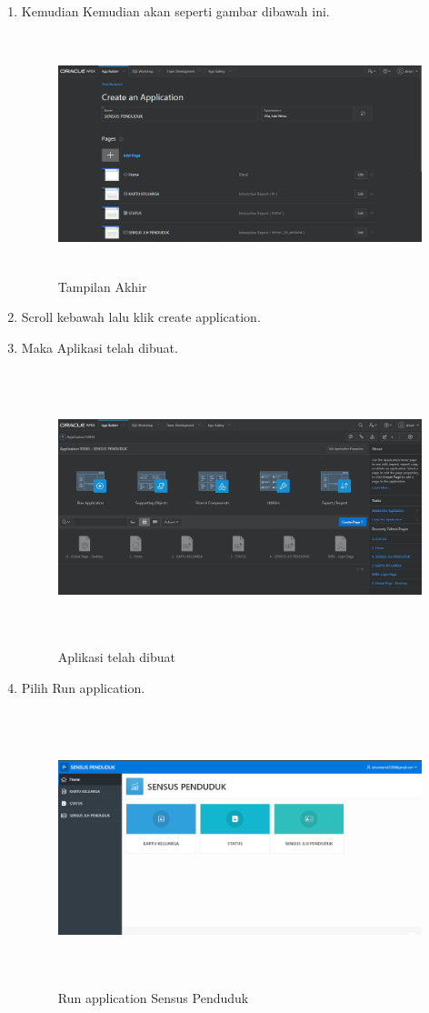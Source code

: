 \begin{enumerate}
\item Kemudian Kemudian akan seperti gambar dibawah ini.
\begin{figure}[!htbp]
\centering
\includegraphics[width=13cm,height=7cm]{figures/H6.PNG}
\caption{Tampilan Akhir}
\label{penanda}
\end{figure}
\item  Scroll kebawah lalu klik create application.
\item Maka Aplikasi telah dibuat.
\begin{figure}[!htbp]
\centering
\includegraphics[width=13cm,height=8cm]{figures/H7.PNG}
\caption{Aplikasi telah dibuat}
\label{penanda}
\end{figure}
\item Pilih Run application.
\begin{figure}[!htbp]
\centering
\includegraphics[width=13cm,height=8cm]{figures/H8.PNG}
\caption{Run application Sensus Penduduk}
\label{penanda}
\end{figure}
\end{enumerate}

